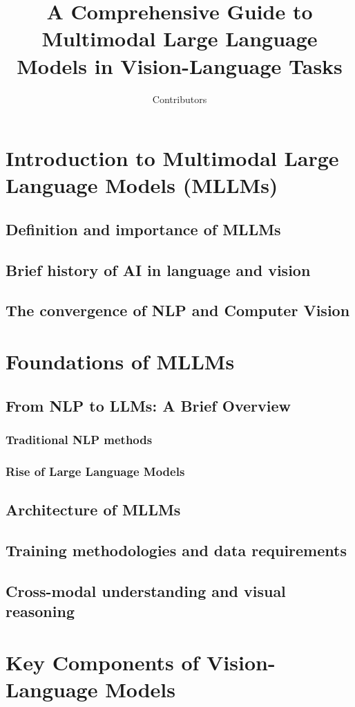 \documentclass{book}
\title{A Comprehensive Guide to Multimodal Large Language Models in Vision-Language Tasks}
\author{Contributors}
\begin{document}
\maketitle
\tableofcontents

\chapter{Introduction to Multimodal Large Language Models (MLLMs)}
\section{Definition and importance of MLLMs}
\section{Brief history of AI in language and vision}
\section{The convergence of NLP and Computer Vision}

\chapter{Foundations of MLLMs}
\section{From NLP to LLMs: A Brief Overview}
\subsection{Traditional NLP methods}
\subsection{Rise of Large Language Models}
\section{Architecture of MLLMs}
\section{Training methodologies and data requirements}
\section{Cross-modal understanding and visual reasoning}

\chapter{Key Components of Vision-Language Models}
\end{document}
